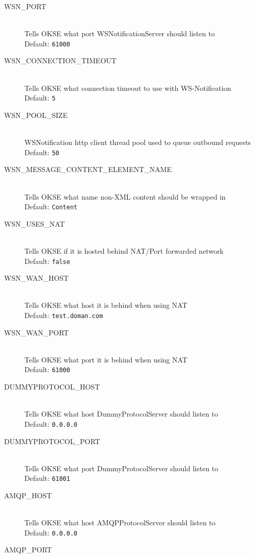 \begin{description}
  \item[WSN\_PORT] \hfill \\
  Tells OKSE what port WSNotificationServer should listen to \hfill \\ Default: \verb!61000!
  \item[WSN\_CONNECTION\_TIMEOUT] \hfill \\
  Tells OKSE what connection timeout to use with WS-Notification \hfill \\ Default: \verb!5!
  \item[WSN\_POOL\_SIZE] \hfill \\
   WSNotification http client thread pool used to queue outbound requests \hfill \\ Default: \verb!50!
   \item[WSN\_MESSAGE\_CONTENT\_ELEMENT\_NAME] \hfill \\
  Tells OKSE what name non-XML content should be wrapped in \hfill \\ Default: \verb!Content!
  \item[WSN\_USES\_NAT] \hfill \\
  Tells OKSE if it is hosted behind NAT/Port forwarded network \hfill \\ Default: \verb!false!
  \item[WSN\_WAN\_HOST] \hfill \\
  Tells OKSE what host it is behind when using NAT \hfill \\ Default: \verb!test.doman.com!
  \item[WSN\_WAN\_PORT] \hfill \\
  Tells OKSE what port it is behind when using NAT \hfill \\ Default: \verb!61000!
  \item[DUMMYPROTOCOL\_HOST] \hfill \\
  Tells OKSE what host DummyProtocolServer should listen to \hfill \\ Default: \verb!0.0.0.0!
  \item[DUMMYPROTOCOL\_PORT] \hfill \\
  Tells OKSE what port DummyProtocolServer should listen to \hfill \\ Default: \verb!61001!
  \item[AMQP\_HOST] \hfill \\
  Tells OKSE what host AMQPProtocolServer should listen to \hfill \\ Default: \verb!0.0.0.0!
  \item[AMQP\_PORT] \hfill \\

\end{description}
